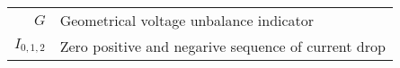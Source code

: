 \begin{scriptsize}
\begin{tabularx}{\textwidth}{r|X}
%
%
$G$                               & Geometrical voltage unbalance indicator \\
%
%
$I_{0,1,2}$												& Zero positive and negarive sequence of current drop\\	
%
%

\end{tabularx}
\end{scriptsize}
